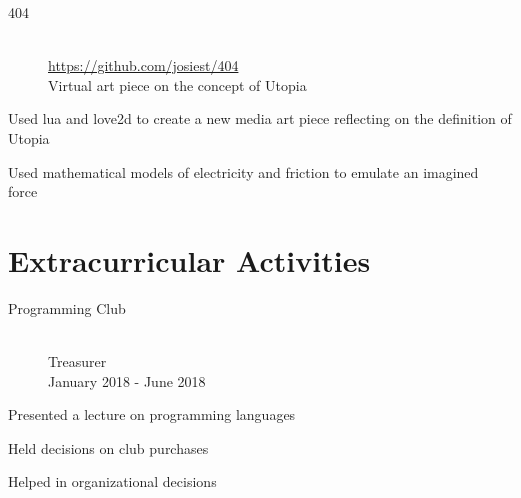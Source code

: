 \documentclass[10pt]{article}
\newenvironment{itemize*}
{\begin{itemize}[leftmargin=*]
    \setlength{\itemsep}{0pt}
    \setlength{\parskip}{0pt}}
{\end{itemize}}
\begin{document}
\begin{paracol}{2}
\begin{description}
\item[404]~\\
    \url{https://github.com/josiest/404}\\
    Virtual art piece on the concept of Utopia
\end{description}
\begin{itemize*}
\item Used lua and love2d to create a new media art piece reflecting on the definition of Utopia
\item Used mathematical models of electricity and friction to emulate an imagined force
\end{itemize*}

\section*{Extracurricular Activities}

\begin{description}
\item[Programming Club]~\\
    Treasurer\\
    January 2018 - June 2018
\end{description}
\begin{itemize*}
\item Presented a lecture on programming languages
\item Held decisions on club purchases
\item Helped in organizational decisions
\end{itemize*}
\end{paracol}
\end{document}
